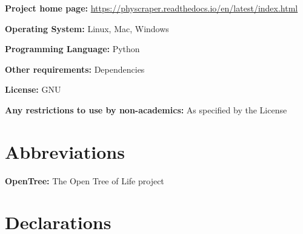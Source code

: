 \documentclass{bmcart}
\begin{document}
\textbf{Project home page:} \href{https://physcraper.readthedocs.io/en/latest/index.html}{https://physcraper.readthedocs.io/en/latest/index.html}

\textbf{Operating System:} Linux, Mac, Windows

\textbf{Programming Language:} Python

\textbf{Other requirements:} Dependencies

\textbf{License:} GNU

\textbf{Any restrictions to use by non-academics:} As specified by the License

\section*{Abbreviations}

\textbf{OpenTree:} The Open Tree of Life project

\section*{Declarations}
\end{document}
